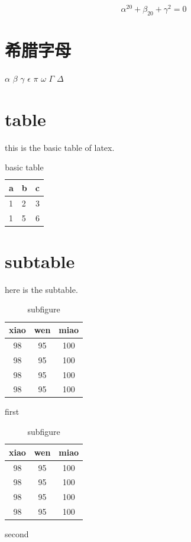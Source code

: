 \documentclass[12pt]{report}
\begin{document}
$$\alpha^{20}+\beta_{20}+\gamma^2=0$$

\section{希腊字母}
$\alpha$ $\beta$ $\gamma$ $\epsilon$ $\pi$
$\omega$ $\Gamma$ $\Delta$ 

\section{table}
this is the basic table of latex.
\begin{table}
    \centering
    \begin{tabular}{l | l | r}
        \hline
        a & b & c\\
        \hline
        1 & 2 & 3\\
        1 & 5 & 6\\
        \hline 
    \end{tabular}
    \caption{basic table}
    \label{basic_tab}
\end{table}

\section{subtable}
here is the subtable.
\begin{table}
    \begin{subtable}[h]{0.45\textwidth}
        \centering
        \begin{tabular}{ccc}\\
            xiao & wen & miao\\
            \hline
            98 & 95 & 100\\
            98 & 95 & 100\\
            98 & 95 & 100\\
            98 & 95 & 100\\
            \hline
            
        \end{tabular}
        \caption{first}
        \label{first}
    \end{subtable}
    \hfill
    \begin{subtable}[h]{0.45\textwidth}
        \centering
        \begin{tabular}{ccc}\\
            xiao & wen & miao\\
            \hline
            98 & 95 & 100\\
            98 & 95 & 100\\
            98 & 95 & 100\\
            98 & 95 & 100\\
            \hline
            
        \end{tabular}
        \caption{second}
        \label{second}
    \end{subtable}
    \caption{subfigure}
    \label{sub}
\end{table}
\end{document}

